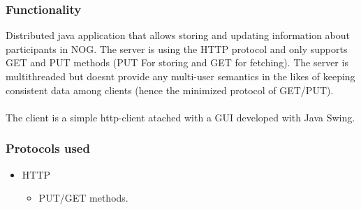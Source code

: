 \documentclass[a4paper, 11pt]{article}
\begin{document}
\subsubsection{Functionality}
Distributed java application that allows storing and updating information about participants in NOG. The server is using the HTTP protocol and only supports GET and PUT methods (PUT For storing and GET for fetching). The server is multithreaded but doesnt provide any multi-user semantics in the likes of keeping consistent data among clients (hence the minimized protocol of GET/PUT).
\\\\The client is a simple http-client atached with a GUI developed with Java Swing.
\subsubsection{Protocols used}
\begin{itemize}
\item HTTP 
  \begin{itemize}
  \item PUT/GET methods.
  \end{itemize}
\end{itemize}
\end{document}
